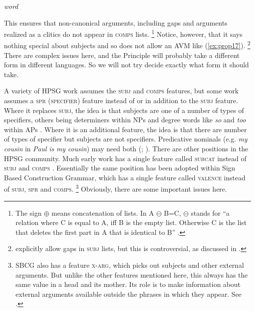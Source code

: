 \documentclass[output=paper
	        ,collection
	        ,collectionchapter
 	        ,biblatex
                ,babelshorthands
                ,newtxmath
                ,draftmode
                ,colorlinks, citecolor=brown
]{langscibook}
\begin{document}
\ea\label{ex:prop20}
\emph{word} \impl
{}
\z

This ensures that non-canonical arguments, including gaps and arguments realized as a clitics do not appear in \textsc{comps} lists.%
%
\footnote{The sign $\oplus$ means concatenation of lists. In A $\ominus$ B=C, $\ominus$ stands for ``a relation where C is equal to A, iff B is the empty list. Otherwise C is the list that deletes the first part in A that is identical to B'' \citep[]{Mueller2000h}.}
%
Notice, however, that it says nothing special about subjects and so does not allow an AVM like (\ref{ex:prop17}).%
%
\footnote{\citet[177--183]{GSag2000a-u} explicitly allow gaps in \textsc{subj} lists, but this is controversial, as discussed in .}
%
There are complex issues here, and the Principle will probably take a different form in different languages. So we will not try decide exactly what form it should take.

A variety of HPSG work assumes the \textsc{subj} and \textsc{comps} features, but some work assumes a \textsc{spr (specifier)} feature instead of or in addition to the \textsc{subj} feature. Where it replaces \textsc{subj}, the idea is that subjects are one of a number of types of specifiers, others being determiners within NPs and degree words like \emph{so} and \emph{too} within APs \citep{SWB2003a}. Where it is an additional feature, the idea is that there are number of types of specifier but subjects are not specifiers. Predicative nominals (e.g. \emph{my cousin} in \emph{Paul is my cousin}) may need both (\citealp[Section~9.4.1]{ps2}; \citealp[409]{GSag2000a-u}\citealp{AG2003b-u}). There are other positions in the HPSG community. Much early work has a single feature called \textsc{subcat} instead of \textsc{subj} and \textsc{comps} \citep{ps}. Essentially the same position has been adopted within Sign Based Construction Grammar, which has a single feature called \textsc{valence} instead of \textsc{subj, spr} and \textsc{comps}.%
%
\footnote{SBCG also has a feature \textsc{x-arg}, which picks out subjects and other external arguments. But unlike the other features mentioned here, this always has the same value in a head and its mother. Its role is to make information about external arguments available outside the phrases in which they appear.  See \citet[84, 149--151]{Sag2007a,Sag2012a}.}
%
Obviously, there are some important issues here.
\end{document}
